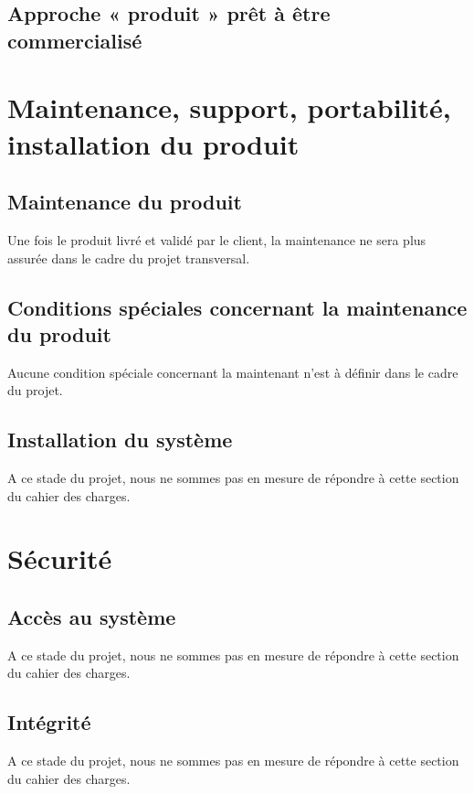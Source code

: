 		\subsection{Approche « produit » prêt à être commercialisé}
	
	
	\section{Maintenance, support, portabilité, installation du produit}
		\subsection{Maintenance du produit}
		Une fois le produit livré et validé par le client, la maintenance ne sera plus assurée dans le cadre du projet transversal. 
	
		\subsection{Conditions spéciales concernant la maintenance du produit}
		Aucune condition spéciale concernant la maintenant n'est à définir dans le cadre du projet. 
	
	
	
		\subsection{Installation du système}
		A ce stade du projet, nous ne sommes pas en mesure de répondre à cette section du cahier des charges. 
	
	
	\section{Sécurité}
		\subsection{Accès au système}
		A ce stade du projet, nous ne sommes pas en mesure de répondre à cette section du cahier des charges. 	

		\subsection{Intégrité}
		A ce stade du projet, nous ne sommes pas en mesure de répondre à cette section du cahier des charges. 

